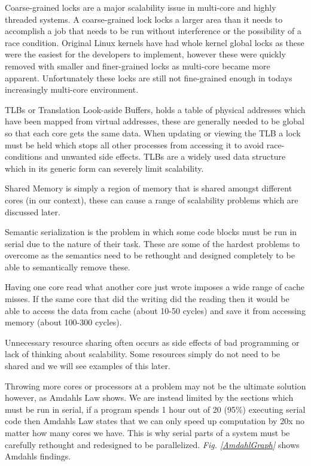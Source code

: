 \documentclass[journal]{IEEEtran}
\begin{document}
\vspace{5mm}

Coarse-grained locks are a major scalability issue in multi-core and highly threaded systems. A coarse-grained lock locks a larger area than it needs to accomplish a job that needs to be run without interference or the possibility of a race condition. Original Linux kernels have had whole kernel global locks as these were the easiest for the developers to implement, however these were quickly removed with smaller and finer-grained locks as multi-core became more apparent. Unfortunately these locks are still not fine-grained enough in todays increasingly multi-core environment.

TLBs or Translation Look-aside Buffers, holds a table of physical addresses which have been mapped from virtual addresses, these are generally needed to be global so that each core gets the same data. When updating or viewing the TLB a lock must be held which stops all other processes from accessing it to avoid race-conditions and unwanted side effects. TLBs are a widely used data structure which in its generic form can severely limit scalability.

Shared Memory is simply a region of memory that is shared amongst different cores (in our context), these can cause a range of scalability problems which are discussed later.

Semantic serialization is the problem in which some code blocks must be run in serial due to the nature of their task. These are some of the hardest problems to overcome as the semantics need to be rethought and designed completely to be able to semantically remove these.

Having one core read what another core just wrote imposes a wide range of cache misses. If the same core that did the writing did the reading then it would be able to access the data from cache (about 10-50 cycles) and save it from accessing memory (about 100-300 cycles).

Unnecessary resource sharing often occurs as side effects of bad programming or lack of thinking about scalability. Some resources simply do not need to be shared and we will see examples of this later.

Throwing more cores or processors at a problem may not be the ultimate solution however, as Amdahls Law \cite{Amdahl} shows. We are instead limited by the sections which must be run in serial, if a program spends 1 hour out of 20 (95\%) executing serial code then Amdahls Law states that we can only speed up computation by 20x no matter how many cores we have. This is why serial parts of a system must be carefully rethought and redesigned to be parallelized. \emph{Fig. \ref{AmdahlGraph}} shows Amdahls findings. 
\end{document}
